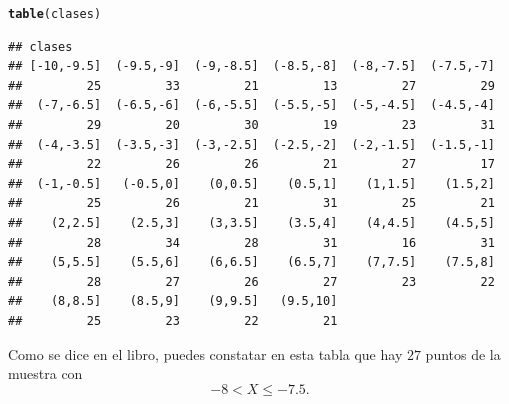 \documentclass[10pt,a4paper]{article}\usepackage[]{graphicx}\usepackage[]{color}
\makeatletter
\newcommand{\hlstd}[1]{\textcolor[rgb]{0.345,0.345,0.345}{#1}}%
\newcommand{\hlkwd}[1]{\textcolor[rgb]{0.737,0.353,0.396}{\textbf{#1}}}%
\newenvironment{kframe}{%
 \def\at@end@of@kframe{}%
 \ifinner\ifhmode%
  \def\at@end@of@kframe{\end{minipage}}%
  \begin{minipage}{\columnwidth}%
 \fi\fi%
 \def\FrameCommand##1{\hskip\@totalleftmargin \hskip-\fboxsep
 \colorbox{shadecolor}{##1}\hskip-\fboxsep
     \hskip-\linewidth \hskip-\@totalleftmargin \hskip\columnwidth}%
 \MakeFramed {\advance\hsize-\width
   \@totalleftmargin\z@ \linewidth\hsize
   \@setminipage}}%
 {\par\unskip\endMakeFramed%
 \at@end@of@kframe}
\newenvironment{knitrout}{}{} %
\makeatother
\begin{document}
\begin{enumerate}
\begin{knitrout}
\begin{kframe}
\begin{alltt}
\hlkwd{table}\hlstd{(clases)}
\end{alltt}
\begin{verbatim}
## clases
## [-10,-9.5]  (-9.5,-9]  (-9,-8.5]  (-8.5,-8]  (-8,-7.5]  (-7.5,-7] 
##         25         33         21         13         27         29 
##  (-7,-6.5]  (-6.5,-6]  (-6,-5.5]  (-5.5,-5]  (-5,-4.5]  (-4.5,-4] 
##         29         20         30         19         23         31 
##  (-4,-3.5]  (-3.5,-3]  (-3,-2.5]  (-2.5,-2]  (-2,-1.5]  (-1.5,-1] 
##         22         26         26         21         27         17 
##  (-1,-0.5]   (-0.5,0]    (0,0.5]    (0.5,1]    (1,1.5]    (1.5,2] 
##         25         26         21         31         25         21 
##    (2,2.5]    (2.5,3]    (3,3.5]    (3.5,4]    (4,4.5]    (4.5,5] 
##         28         34         28         31         16         31 
##    (5,5.5]    (5.5,6]    (6,6.5]    (6.5,7]    (7,7.5]    (7.5,8] 
##         28         27         26         27         23         22 
##    (8,8.5]    (8.5,9]    (9,9.5]   (9.5,10] 
##         25         23         22         21
\end{verbatim}
\end{kframe}
\end{knitrout}
Como se dice en el libro, puedes constatar en esta tabla que hay $27$ puntos de la muestra con
\[-8<X\leq -7.5.\]


\end{enumerate}
\end{document}
